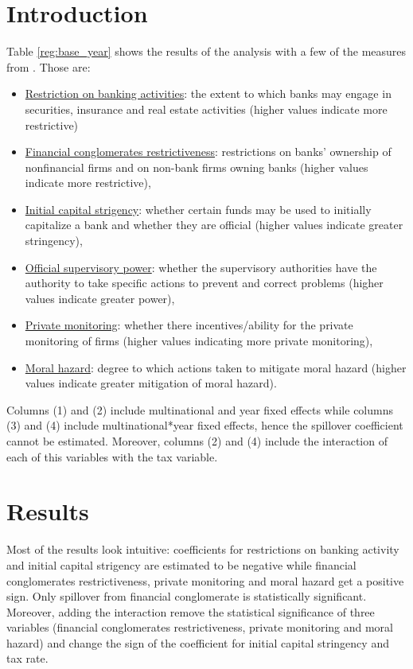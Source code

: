 \documentclass[12pt]{article}
\begin{document}
	\section{Introduction} \label{sec:intro}
	 Table \ref{reg:base_year} shows the results of the analysis with a few of the measures from \cite*{barth2013bank}. Those are: 
	 \begin{itemize}
	 	\item \underline{Restriction on banking activities}: the extent to which banks may engage in securities, insurance and real estate activities (higher values indicate more restrictive)
	 	\item \underline{Financial conglomerates restrictiveness}: restrictions on banks' ownership of nonfinancial firms and on non-bank firms owning banks (higher values indicate more restrictive),
	 	\item  \underline{Initial capital strigency}: whether certain funds may be used to initially capitalize a bank and whether they are official (higher values indicate greater stringency),
	 	\item \underline{Official supervisory power}: whether the supervisory authorities have the authority to take specific actions to prevent and correct problems (higher values indicate greater power),
	 	\item \underline{Private monitoring}: whether there incentives/ability for the private monitoring of firms (higher values indicating more private monitoring),
	 	\item \underline{Moral hazard}: degree to which actions taken to mitigate moral hazard (higher values indicate greater mitigation of moral hazard).
	 \end{itemize}
	 
	 Columns (1) and (2) include multinational and year fixed effects while columns (3) and (4) include multinational*year fixed effects, hence the spillover coefficient cannot be estimated. Moreover, columns (2) and (4) include the interaction of each of this variables with the tax variable.      
 		
	 
	 	\begin{small}
	 	{
	 		
	 	}
	 \end{small}
 
	 \section{Results} \label{sec:results}
	Most of the results look intuitive: coefficients for restrictions on banking activity and initial capital strigency are estimated to be negative while financial conglomerates restrictiveness, private monitoring and moral hazard get a positive sign. Only spillover from financial conglomerate is statistically significant. Moreover, adding the interaction remove the statistical significance of three variables (financial conglomerates restrictiveness, private monitoring and moral hazard) and change the sign of the coefficient for initial capital stringency and tax rate.
	
\end{document}
